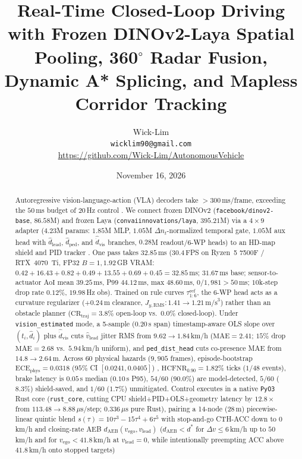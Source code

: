 \documentclass[10pt,twocolumn,letterpaper]{article}
\title{Real-Time Closed-Loop Driving with Frozen DINOv2-Laya Spatial Pooling, 360$^\circ$ Radar Fusion, Dynamic A* Splicing, and Mapless Corridor Tracking}
\author{
  Wick-Lim \\
  \texttt{wicklim90@gmail.com} \\
  \url{https://github.com/Wick-Lim/AutonomousVehicle}
}
\date{November 16, 2026}
\begin{document}
\maketitle

\begin{abstract}
Autoregressive vision-language-action (VLA) decoders \cite{brohan2023rt2,kim2024openvla,liu2023visual} take $>300$\,ms/frame, exceeding the $50$\,ms budget of $20$\,Hz control \cite{dosovitskiy2017carla,li2022metadrive,geiger2012we,caesar2020nuscenes,sun2020scalability}. We connect frozen DINOv2 (\texttt{facebook/dinov2-base}, $86.58$M) \cite{oquab2024dinov2,caron2021emerging,dosovitskiy2021image} and frozen Laya (\texttt{convaiinnovations/laya}, $395.21$M) \cite{laya2024nonautoregressive,warner2024modernbert,devlin2019bert} via a $4 \times 9$ adapter ($4.23$M params: $1.85$M MLP, $1.05$M $\Delta n_t$-normalized temporal gate, $1.05$M aux head with $\hat{d}_{\text{lead}}$, $\hat{d}_{\text{ped}}$, and $\hat{\dot{d}}_{\text{vis}}$ branches, $0.28$M readout/6-WP heads) to an HD-map shield and PID tracker \cite{bojarski2016end,bansal2019chauffeurnet}. One pass takes $32.85$\,ms ($30.4$\,FPS on Ryzen~5 7500F / RTX~4070~Ti, FP32 $B=1, 1.92$\,GB VRAM: $0.42 + 16.43 + 0.82 + 0.49 + 13.55 + 0.69 + 0.45 = 32.85$\,ms; $31.67$\,ms base; sensor-to-actuator $\text{AoI}$ mean $39.25$\,ms, P99 $44.12$\,ms, max $48.60$\,ms, $0/1,981 > 50$\,ms; $10$k-step drop rate $0.12\%$, $19.98$\,Hz obs). Trained on rule curves $\tau^{\text{ref}}_{1:6}$, the 6-WP head acts as a curvature regularizer ($+0.24$\,m clearance, $J_{y,\text{RMS}}: 1.41 \to 1.21\,\text{m/s}^3$) rather than an obstacle planner ($\text{CR}_{\text{traj}}=3.8\%$ open-loop vs.\ $0.0\%$ closed-loop). Under \texttt{vision\_estimated} mode, a 5-sample ($0.20$\,s span) timestamp-aware OLS slope \cite{savitzky1964smoothing,kalman1960new} over $(t_i, \hat{d}_i)$ plus $\hat{\dot{d}}_{\text{vis}}$ cuts $\hat{v}_{\text{lead}}$ jitter RMS from $9.62 \to 1.84$\,km/h ($\text{MAE}=2.41$; $15\%$ drop $\text{MAE}=2.68$ vs.\ $5.94$\,km/h uniform), and \texttt{ped\_dist\_head} cuts co-presence MAE from $14.8 \to 2.64$\,m. Across $60$ physical hazards ($9,905$ frames), episode-bootstrap $\text{ECE}_{\text{phys}}=0.0318$ ($95\%$ CI $[0.0241, 0.0405]$) \cite{guo2017calibration,zadrozny2002transforming,brier1950verification}, $\text{HCFNR}_{0.90}=1.82\%$ ticks ($1/48$ events), brake latency is $0.05$\,s median ($0.10$\,s P95), $54/60$ ($90.0\%$) are model-detected, $5/60$ ($8.3\%$) shield-saved, and $1/60$ ($1.7\%$) unmitigated. Control executes in a native \texttt{PyO3} Rust core (\texttt{rust\_core}, cutting CPU shield+PID+OLS+geometry latency by $12.8\times$ from $113.48 \to 8.88\,\mu\text{s}$/step; $0.336\,\mu\text{s}$ pure Rust), pairing a 14-node ($28$\,m) piecewise-linear quintic blend $s(\tau) = 10\tau^3 - 15\tau^4 + 6\tau^5$ \cite{flash1985coordination,werling2010optimal,thrun2006stanley,hoffmann2007autonomous,coulter1992implementation,paden2016survey} with stop-and-go CTH-ACC down to $0$\,km/h and closing-rate AEB $d_{\text{AEB}}(v_{\text{ego}},v_{\text{lead}})$ ($d_{\text{AEB}} < d^*$ for $\Delta v \le 6$\,km/h up to $50$\,km/h and for $v_{\text{ego}} < 41.8$\,km/h at $v_{\text{lead}}=0$, while intentionally preempting ACC above $41.8$\,km/h onto stopped targets) 
\end{abstract}
\end{document}
